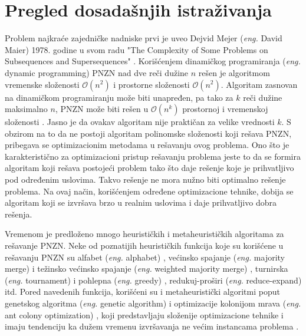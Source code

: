 \documentclass[12pt,oneside]{memoir}
\begin{document}
\section{Pregled dosadašnjih istraživanja}
Problem najkraće zajedničke nadniske prvi je uveo Dejvid Mejer (\textit{eng.} David Maier) 1978. godine u svom radu 
"The Complexity of Some Problems on Subsequences and Supersequences" \cite{Maier}. Korišćenjem dinamičkog
programiranja (\textit{eng.} dynamic programming) PNZN nad dve reči dužine $n$ rešen je algoritmom vremenske 
složenosti $\mathcal{O}(n^{2})$ i prostorne složenosti $\mathcal{O}(n^{2})$. Algoritam zasnovan na dinamičkom programiranju
može biti unapređen, pa tako za $k$ reči dužine maksimalno $n$, PNZN može biti rešen u $\mathcal{O}(n^{k})$ prostornoj i 
vremenskoj složenosti \cite{SCSDinamicProg}. Jasno je da ovakav algoritam nije praktičan za velike vrednosti $k$. S obzirom na to da ne postoji 
algoritam polinomske složenosti koji rešava PNZN, pribegava se optimizacionim metodama u rešavanju ovog problema.
Ono što je karakteristično za optimizacioni pristup rešavanju problema jeste to da se formira algoritam koji rešava
postojeći problem tako što daje rešenje koje je prihvatljivo pod određenim uslovima. Takvo rešenje ne mora nužno biti
optimalno rešenje problema. Na ovaj način, korišćenjem određene optimizacione tehnike, dobija se algoritam koji se izvršava
brzo u realnim uslovima i daje prihvatljivo dobra rešenja.

Vremenom je predloženo mnogo heurističkih i metaheurističkih algoritama za rešavanje PNZN.
Neke od poznatijih heurističkih funkcija koje su korišćene u rešavanju PNZN su alfabet (\textit{eng.} alphabet) \cite{AlphabetSCS}, većinsko spajanje (\textit{eng.} majority merge) 
i težinsko većinsko spajanje (\textit{eng.} weighted majority merge) \cite{ProbabilisticBS}, turnirska (\textit{eng.} tournament) i pohlepna (\textit{eng.} greedy) \cite{Tournament},
redukuj-proširi (\textit{eng.} reduce-expand) \cite{AlphabetSCS} itd. Pored navedenih funkcija, korišćeni su i metaheuristički algoritmi poput genetskog algoritma (\textit{eng.} genetic algorithm) \cite{SCSGenetic} i 
optimizacije kolonijom mrava (\textit{eng.} ant colony optimization) \cite{SCSColony}, koji predstavljaju složenije optimizacione tehnike i imaju
tendenciju ka dužem vremenu izvršavanja ne većim instancama problema \cite{SCSSBetterSolution}.
\end{document}
